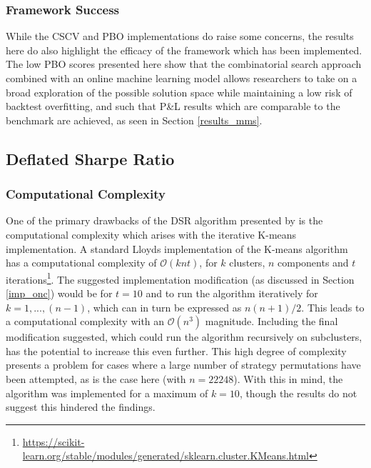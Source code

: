 \documentclass[a4paper,11pt,oneside]{article}
\theoremstyle{plain}
\theoremstyle{definition}
\begin{document}
	
	\subsubsection{Framework Success}
	
	
	While the CSCV and PBO implementations do raise some concerns, the results here do also highlight the efficacy of the framework which has been implemented. The low PBO scores presented here show that the combinatorial search approach combined with an online machine learning model allows researchers to take on a broad exploration of the possible solution space while maintaining a low risk of backtest overfitting, and such that P\&L results which are comparable to the benchmark are achieved, as seen in Section \ref{results_mms}.
	
	\newpage

	\subsection{Deflated Sharpe Ratio}\label{results_dsr}	
	
	\subsubsection{Computational Complexity}
	
	One of the primary drawbacks of the DSR algorithm presented by \citet{PradoDSR} is the computational complexity which arises with the iterative K-means implementation. A standard Lloyds implementation of the K-means algorithm has a computational complexity of $\mathcal{O}(knt)$, for $k$ clusters, $n$ components and $t$ iterations\footnote{\url{https://scikit-learn.org/stable/modules/generated/sklearn.cluster.KMeans.html}}. The suggested implementation modification (as discussed in Section \ref{imp_onc}) would be for $t=10$ and to run the algorithm iteratively for $k=1,...,(n-1)$, which can in turn be expressed as $n(n+1)/2$. This leads to a computational complexity with an $\mathcal{O}(n^3)$ magnitude. Including the final modification suggested, which could run the algorithm recursively on subclusters, has the potential to increase this even further. This high degree of complexity presents a problem for cases where a large number of strategy permutations have been attempted, as is the case here (with $n = 22248$). With this in mind, the algorithm was implemented for a maximum of $k=10$, though the results do not suggest this hindered the findings.\newline
	
\end{document}
